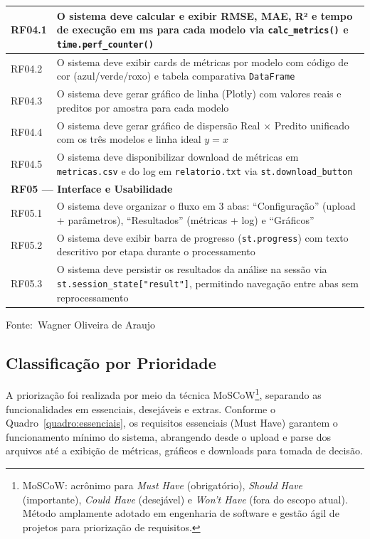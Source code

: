 \documentclass[12pt,a4paper]{article}
\newcommand{\oautor}{Wagner Oliveira de Araujo}
\begin{document}
\begin{quadro}[!ht]
\begin{threeparttable}
\begin{tabularx}{\textwidth}{|l|X|}
RF04.1 & O sistema deve calcular e exibir RMSE, MAE, R² e tempo de execução em ms para cada modelo via \texttt{calc\_metrics()} e \texttt{time.perf\_counter()} \\ \hline
RF04.2 & O sistema deve exibir cards de métricas por modelo com código de cor (azul/verde/roxo) e tabela comparativa \texttt{DataFrame} \\ \hline
RF04.3 & O sistema deve gerar gráfico de linha (Plotly) com valores reais e preditos por amostra para cada modelo \\ \hline
RF04.4 & O sistema deve gerar gráfico de dispersão Real $\times$ Predito unificado com os três modelos e linha ideal $y = x$ \\ \hline
RF04.5 & O sistema deve disponibilizar download de métricas em \texttt{metricas.csv} e do log em \texttt{relatorio.txt} via \texttt{st.download\_button} \\ \hline
\multicolumn{2}{|l|}{\textbf{RF05 --- Interface e Usabilidade}} \\ \hline
RF05.1 & O sistema deve organizar o fluxo em 3 abas: ``Configuração'' (upload + parâmetros), ``Resultados'' (métricas + log) e ``Gráficos'' \\ \hline
RF05.2 & O sistema deve exibir barra de progresso (\texttt{st.progress}) com texto descritivo por etapa durante o processamento \\ \hline
RF05.3 & O sistema deve persistir os resultados da análise na sessão via \texttt{st.session\_state["result"]}, permitindo navegação entre abas sem reprocessamento \\ \hline
\end{tabularx}
\begin{tablenotes}[flushleft]
\footnotesize
\item Fonte:~\oautor
\end{tablenotes}
\end{threeparttable}
\end{quadro}

\newpage
\subsection{Classificação por Prioridade}

A priorização foi realizada por meio da técnica MoSCoW\footnote{MoSCoW: acrônimo para \textit{Must Have} (obrigatório), \textit{Should Have} (importante), \textit{Could Have} (desejável) e \textit{Won't Have} (fora do escopo atual). Método amplamente adotado em engenharia de software e gestão ágil de projetos para priorização de requisitos.}, separando as funcionalidades em essenciais, desejáveis e extras. Conforme o Quadro~\ref{quadro:essenciais}, os requisitos essenciais (Must Have) garantem o funcionamento mínimo do sistema, abrangendo desde o upload e parse dos arquivos até a exibição de métricas, gráficos e downloads para tomada de decisão.
\end{document}
